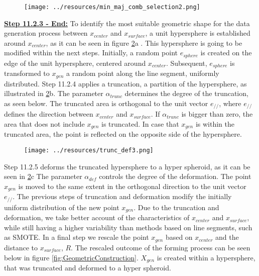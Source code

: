 \documentclass[parskip=full]{scrartcl}
\begin{document}
\begin{figure}[H]
	\centering
	\texttt{[image: ../resources/min\_maj\_comb\_selection2.png]}
	\label{fig:Combined}
\end{figure}

\textbf{\underline{Step 11.2.3 - End:}} To identify the most suitable geometric shape for the data generation process between $x_{center}$ and $x_{surface}$, a unit hypersphere is established around $x_{center}$, as it can be seen in figure \ref{fig:Hypersphere}a . This hypersphere is going to be modified within the next steps. Initially, a random point $e_{sphere}$ is created on the edge of the unit hypersphere, centered around $x_{center}$. Subsequent, $e_{sphere}$ is transformed to $x_{gen}$ a random point along the line segment, uniformly distributed. Step 11.2.4 applies a truncation, a partition of the hypersphere, as illustrated in \ref{fig:Hypersphere}b. The parameter $\alpha_{trunc}$ determines the degree of the truncation, as seen below. The truncated area is orthogonal to the unit vector $e_{//}$, where $e_{//}$ defines the direction between $x_{center}$ and $x_{surface}$. If $\alpha_{trunc}$ is bigger than zero, the area that does not include $x_{gen}$ is truncated. In case that $x_{gen}$ is within the truncated area, the point is reflected on the opposite side of the hypersphere.
\\

\begin{figure}[H]
	\centering
	\texttt{[image: ../resources/trunc\_def3.png]}
	\label{fig:Hypersphere}
\end{figure}

Step 11.2.5 deforms the truncated hypersphere to a hyper spheroid, as it can be seen in \ref{fig:Hypersphere}c The parameter $\alpha_{def}$ controls the degree of the deformation. The point $x_{gen}$ is moved to the same extent in the orthogonal direction to the unit vector $e_{//}$. The previous steps of truncation and deformation modify the initially uniform distribution of the new point $x_{gen}$. Due to the truncation and deformation, we take better account of the characteristics of $x_{center}$ and $x_{surface}$, while still having a higher variability than methods based on line segments, such as SMOTE. In a final step we rescale the point $x_{gen}$ based on $x_{center}$ and the distance to $x_{surface}$, $R$. The rescaled outcome of the forming process can be seen below in figure \ref{fig:GeometricConstruction}. $X_{gen}$ is created within a hypersphere, that was truncated and deformed to a hyper spheroid.
\end{document}
